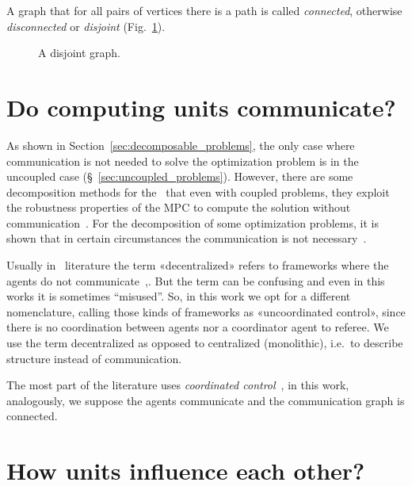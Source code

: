 \documentclass[../main.tex]{subfiles}
\begin{document}
A graph that for all pairs of vertices there is a path is called \emph{connected}, otherwise \emph{disconnected} or \emph{disjoint} (Fig.~\ref{fig:disjoint}).

\begin{figure}[h]
  \centering
  \caption{A disjoint graph.}\label{fig:disjoint}
\end{figure}




\section{Do computing units communicate?}

As shown in Section~\ref{sec:decomposable_problems}, the only case where communication is not needed to solve the optimization problem is in the uncoupled case (\S~\ref{sec:uncoupled_problems}).
However, there are some decomposition methods for the \dmpc\ that even with coupled problems, they exploit the robustness properties of the MPC to compute the solution without communication~\cite{VahidNaghaviEtAl2014}.
For the decomposition of some optimization problems, it is shown that in certain circumstances the communication is not necessary~\cite{VoulgarisElia2022}.
\begin{remark}
  Usually in \dmpc\ literature the term «decentralized» refers to frameworks where the agents do not communicate~\cite[\S 4]{ChristofidesEtAl2013},\cite{NegenbornMaestre2014}.
  But the term can be confusing and even in this works it is sometimes ``misused''.
  So, in this work we opt for a different nomenclature, calling those kinds of frameworks as «uncoordinated control», since there is no coordination between agents nor a coordinator agent to referee. We use the term decentralized as opposed to centralized (monolithic), i.e.\ to describe structure instead of communication.
\end{remark}

The most part of the literature uses \emph{coordinated control}~\cite{NegenbornMaestre2014, ArauzEtAl2021}, in this work, analogously, we suppose the agents communicate and the communication graph is connected.

\section{How units influence each other?}
\end{document}
